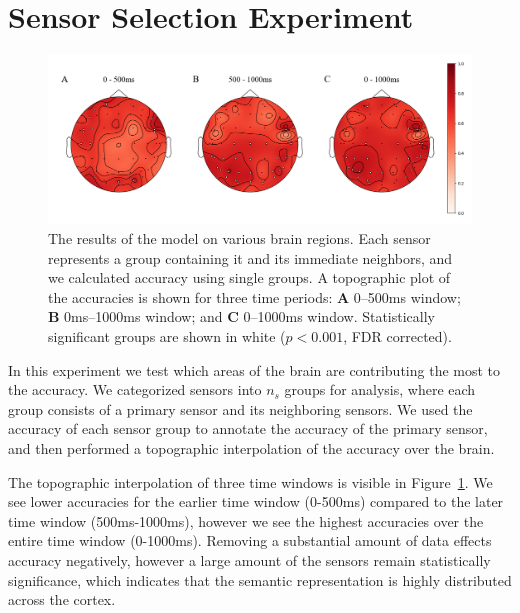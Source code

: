 \section{Sensor Selection Experiment}

\begin{figure}[!tp]
  \centering
  \includegraphics[width=0.9\linewidth]{figures/topographic}
  \caption[Topographic Analysis of \tvt Accuracy]{
    The results of the model on various brain regions. Each sensor represents a 
    group containing it and its immediate neighbors, and we calculated \tvt 
    accuracy using single groups.  A topographic plot of the \tvt accuracies is 
    shown for three time periods: {\bf A}  0--500ms window; {\bf B} 0ms--1000ms 
    window; and {\bf C} 0--1000ms window. Statistically significant groups are 
    shown in white ($p < 0.001$, FDR corrected).
  }
  \label{fig:topographic}
\end{figure}

In this experiment we test which areas of the brain are contributing the most 
to the \tvt accuracy. We categorized sensors into $n_s$ groups for analysis, 
where each group consists of a primary sensor and its neighboring sensors. We 
used the accuracy of each sensor group to annotate the accuracy of the primary 
sensor, and then performed a topographic interpolation of the \tvt accuracy 
over the brain. 

The topographic interpolation of three time windows is visible in 
Figure~\ref{fig:topographic}. We see lower \tvt accuracies for the earlier time 
window (0-500ms) compared to the later time window (500ms-1000ms), however we 
see the highest accuracies over the entire time window (0-1000ms). Removing a 
substantial amount of data effects accuracy negatively, however a large amount 
of the sensors remain statistically significance, which indicates that the 
semantic representation is highly distributed across the cortex.
